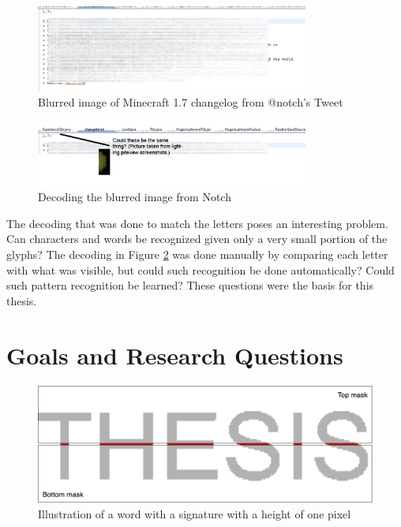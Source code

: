 \begin{figure}[h]
    \centering
    \includegraphics[width=0.8\textwidth]{fig/chapter1/notch_eclipse.png}
    \caption{Blurred image of Minecraft 1.7 changelog from @notch's Tweet}
    \label{fig:notch_imgur}
\end{figure}

\begin{figure}[ht]
    \centering
    \includegraphics[width=0.8\textwidth]{fig/chapter1/notch_eclipse_decoded.png}
    \caption{Decoding the blurred image from Notch}
    \label{fig:notch_eclipse_decoded}
\end{figure}

\newpage
The decoding that was done to match the letters poses an interesting problem. Can characters and words be recognized given only a very small portion of the glyphs? The decoding in Figure \ref{fig:notch_eclipse_decoded} was done manually by comparing each letter with what was visible, but could such recognition be done automatically? Could such pattern recognition be learned? These questions were the basis for this thesis.


\section{Goals and Research Questions}
\label{sec:goals_and_research_questions}
\begin{figure}[ht]
    \centering
    \includegraphics[width=1.\textwidth]{fig/chapter1/signature2.png}
    \caption{Illustration of a word with a signature with a height of one pixel}
    \label{fig:thesis-signature}
\end{figure}


